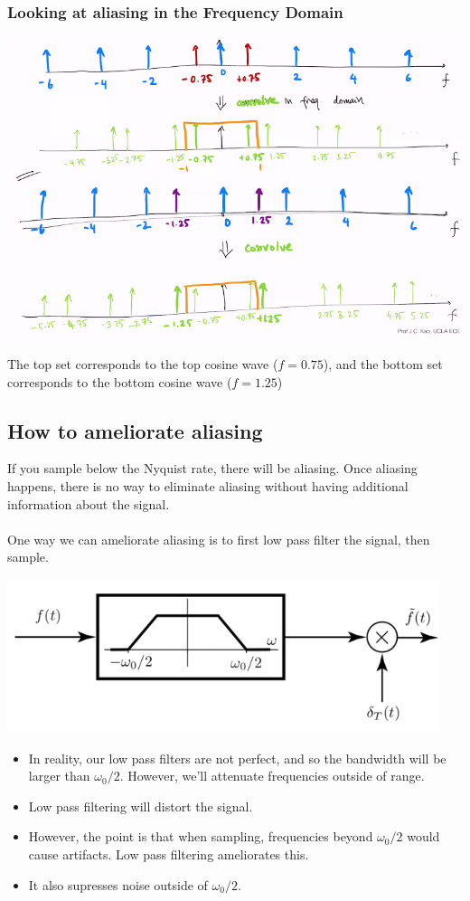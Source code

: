 \documentclass[10pt]{article}
\begin{document}
\subsubsection*{Looking at aliasing in the Frequency Domain}
\begin{center}
    \includegraphics*[scale=0.7]{W8_18.png}
\end{center}
The top set corresponds to the top cosine wave ($f = 0.75$), and the bottom set corresponds to the bottom cosine wave ($f=1.25$)

\subsection*{How to ameliorate aliasing}
If you sample below the Nyquist rate, there will be aliasing.  Once aliasing happens, there is no way to eliminate aliasing without having additional information about the signal.\\\\
One way we can ameliorate aliasing is to first low pass filter the signal, then sample.
\begin{center}
    \includegraphics*[scale=0.8]{W8_19.png}
\end{center}
\begin{itemize}
    \item In reality, our low pass filters are not perfect, and so the bandwidth will be larger than $\omega_0 / 2$.  However, we'll attenuate frequencies outside of range.
    \item Low pass filtering will distort the signal.
    \item However, the point is that when sampling, frequencies beyond $\omega_0 / 2$ would cause artifacts.  Low pass filtering ameliorates this.
    \item It also supresses noise outside of $\omega_0 / 2$.
\end{itemize}
\end{document}
